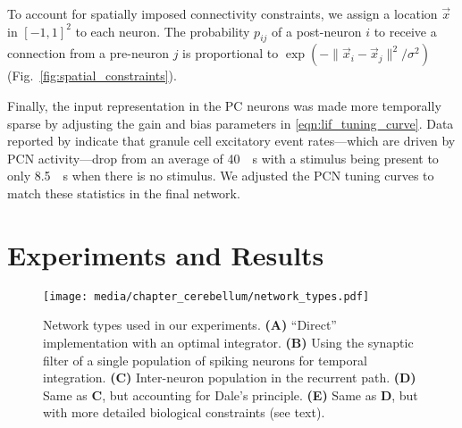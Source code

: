To account for spatially imposed connectivity constraints, we assign a location $\vec x$ in $[-1, 1]^2$ to each neuron. The probability $p_{ij}$ of a post-neuron $i$ to receive a connection from a pre-neuron $j$ is proportional to $\exp \left(- \| \vec x_i - \vec x_j \|^2 / \sigma^{2} \right)$ (Fig.~\ref{fig:spatial_constraints}).

Finally, the input representation in the PC neurons was made more temporally sparse by adjusting the gain and bias parameters in \cref{eqn:lif_tuning_curve}.
Data reported by \citet{chadderton2004integration} indicate that granule cell excitatory event rates---which are driven by PCN activity---drop from an average of \SI{40}{\per\second} with a stimulus being present to only \SI{8.5}{\per\second} when there is no stimulus.
We adjusted the PCN tuning curves to match these statistics in the final network.

\section{Experiments and Results}


\begin{figure}[t]
	\centering
	\texttt{[image: media/chapter\_cerebellum/network\_types.pdf]}
	\caption[Network types used in the cerebellum experiments.]{Network types used in our experiments. \textbf{(A)} \enquote{Direct} implementation with an optimal integrator. \textbf{(B)} Using the synaptic filter of a single population of spiking neurons for temporal integration. \textbf{(C)} Inter-neuron population in the recurrent path. \textbf{(D)} Same as \textbf{C}, but accounting for Dale's principle. \textbf{(E)} Same as \textbf{D}, but with more detailed biological constraints (see text).}
	\label{fig:network_types}
\end{figure}

